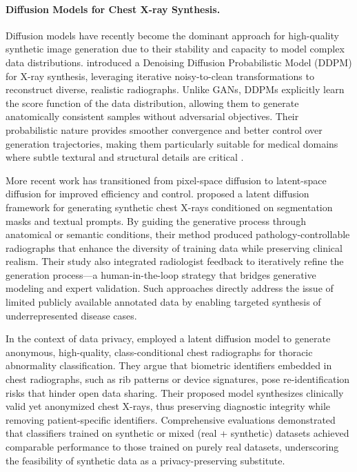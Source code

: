 \paragraph{Diffusion Models for Chest X-ray Synthesis.}
Diffusion models have recently become the dominant approach for high-quality synthetic image generation due to their stability and capacity to model complex data distributions. 
\citet{mahaulpatha2024ddpm} introduced a Denoising Diffusion Probabilistic Model (DDPM) for X-ray synthesis, leveraging iterative noisy-to-clean transformations to reconstruct diverse, realistic radiographs. 
Unlike GANs, DDPMs explicitly learn the score function of the data distribution, allowing them to generate anatomically consistent samples without adversarial objectives. 
Their probabilistic nature provides smoother convergence and better control over generation trajectories, making them particularly suitable for medical domains where subtle textural and structural details are critical \citep{novel_unified_conditional_score_based_generative_framework_2022}.

More recent work has transitioned from pixel-space diffusion to latent-space diffusion for improved efficiency and control. 
\citet{prakash2025evaluating} proposed a latent diffusion framework for generating synthetic chest X-rays conditioned on segmentation masks and textual prompts. 
By guiding the generative process through anatomical or semantic conditions, their method produced pathology-controllable radiographs that enhance the diversity of training data while preserving clinical realism. 
Their study also integrated radiologist feedback to iteratively refine the generation process—a human-in-the-loop strategy that bridges generative modeling and expert validation. 
Such approaches directly address the issue of limited publicly available annotated data by enabling targeted synthesis of underrepresented disease cases. 

In the context of data privacy, \citet{generation_anonymous_chest_radiographs_2023} employed a latent diffusion model to generate anonymous, high-quality, class-conditional chest radiographs for thoracic abnormality classification. 
They argue that biometric identifiers embedded in chest radiographs, such as rib patterns or device signatures, pose re-identification risks that hinder open data sharing. 
Their proposed model synthesizes clinically valid yet anonymized chest X-rays, thus preserving diagnostic integrity while removing patient-specific identifiers. 
Comprehensive evaluations demonstrated that classifiers trained on synthetic or mixed (real + synthetic) datasets achieved comparable performance to those trained on purely real datasets, underscoring the feasibility of synthetic data as a privacy-preserving substitute.

